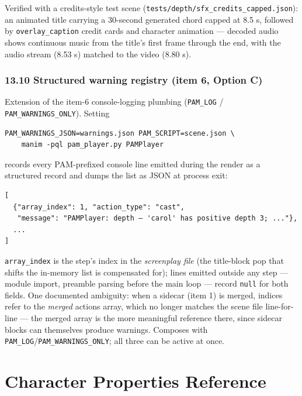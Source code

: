 \documentclass[
  11pt,
]{book}
\begin{document}
Verified with a credits-style test scene
(\texttt{tests/depth/sfx\_credits\_capped.json}): an animated title
carrying a 30-second generated chord capped at 8.5 s, followed by
\texttt{overlay\_caption} credit cards and character animation ---
decoded audio shows continuous music from the title's first frame
through the end, with the audio stream (8.53 s) matched to the video
(8.80 s).

\subsection{\texorpdfstring{13.10 Structured warning registry (item 6, Option C)}{13.10 Structured warning registry}}\label{structured-warning-registry}

Extension of the item-6 console-logging plumbing
(\texttt{PAM\_LOG} / \texttt{PAM\_WARNINGS\_ONLY}). Setting

\begin{verbatim}
PAM_WARNINGS_JSON=warnings.json PAM_SCRIPT=scene.json \
    manim -pql pam_player.py PAMPlayer
\end{verbatim}

records every PAM-prefixed console line emitted during the render as
a structured record and dumps the list as JSON at process exit:

\begin{verbatim}
[
  {"array_index": 1, "action_type": "cast",
   "message": "PAMPlayer: depth — 'carol' has positive depth 3; ..."},
  ...
]
\end{verbatim}

\texttt{array\_index} is the step's index in the \emph{screenplay
file} (the title-block pop that shifts the in-memory list is
compensated for); lines emitted outside any step --- module import,
preamble parsing before the main loop --- record \texttt{null} for
both fields. One documented ambiguity: when a sidecar
(item 1) is merged, indices refer to the \emph{merged} actions array,
which no longer matches the scene file line-for-line --- the merged
array is the more meaningful reference there, since sidecar blocks
can themselves produce warnings. Composes with
\texttt{PAM\_LOG}/\texttt{PAM\_WARNINGS\_ONLY}; all three can be
active at once.

\chapter{Character Properties
Reference}\label{character-properties-reference}
\end{document}
